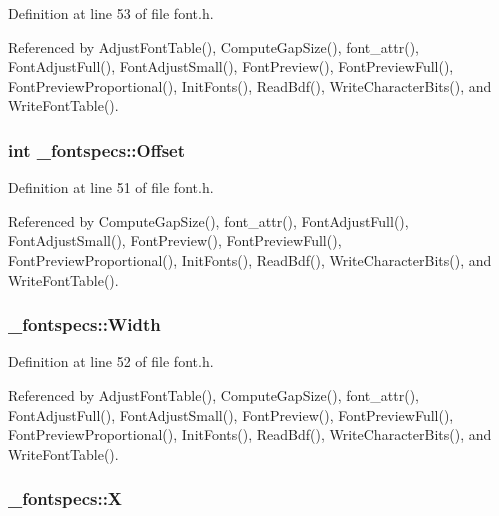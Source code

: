 Definition at line 53 of file font.\-h.



Referenced by Adjust\-Font\-Table(), Compute\-Gap\-Size(), font\-\_\-attr(), Font\-Adjust\-Full(), Font\-Adjust\-Small(), Font\-Preview(), Font\-Preview\-Full(), Font\-Preview\-Proportional(), Init\-Fonts(), Read\-Bdf(), Write\-Character\-Bits(), and Write\-Font\-Table().

\hypertarget{struct__fontspecs_ad4ef5755b58ecd3bbc9894cee258091e}{
\subsubsection[{Offset}]{\setlength{\rightskip}{0pt plus 5cm}int \-\_\-fontspecs\-::\-Offset}}\label{struct__fontspecs_ad4ef5755b58ecd3bbc9894cee258091e}


Definition at line 51 of file font.\-h.



Referenced by Compute\-Gap\-Size(), font\-\_\-attr(), Font\-Adjust\-Full(), Font\-Adjust\-Small(), Font\-Preview(), Font\-Preview\-Full(), Font\-Preview\-Proportional(), Init\-Fonts(), Read\-Bdf(), Write\-Character\-Bits(), and Write\-Font\-Table().

\hypertarget{struct__fontspecs_a8404888a24a2b065d91c4424e1907439}{
\subsubsection[{Width}]{ \-\_\-fontspecs\-::\-Width}}\label{struct__fontspecs_a8404888a24a2b065d91c4424e1907439}


Definition at line 52 of file font.\-h.



Referenced by Adjust\-Font\-Table(), Compute\-Gap\-Size(), font\-\_\-attr(), Font\-Adjust\-Full(), Font\-Adjust\-Small(), Font\-Preview(), Font\-Preview\-Full(), Font\-Preview\-Proportional(), Init\-Fonts(), Read\-Bdf(), Write\-Character\-Bits(), and Write\-Font\-Table().

\hypertarget{struct__fontspecs_a7273a891c79308389718266cb0b66f56}{
\subsubsection[{X}]{ \-\_\-fontspecs\-::\-X}}\label{struct__fontspecs_a7273a891c79308389718266cb0b66f56}


